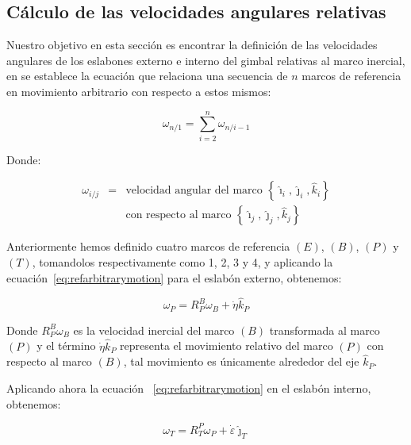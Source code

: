 \subsection{C\'{a}lculo de las velocidades angulares relativas}

Nuestro objetivo en esta secci\'{o}n es encontrar la definici\'{o}n de las
velocidades angulares de los eslabones externo e interno del gimbal
relativas al marco inercial, en \cite[82-84]{10} se establece la ecuaci\'{o}n que  relaciona una secuencia de $n$ marcos de referencia en movimiento arbitrario con respecto a estos mismos:

\begin{equation}
\omega _{n/1}=\overset{n}{\underset{i=2}{\sum }}\omega _{n/i-1}
\label{eq:refarbitrarymotion}
\end{equation}

Donde:

\begin{eqnarray*}
\omega _{i/j} &=&\text{velocidad angular del marco }\left\{ \hat{\imath}_{i},%
\hat{\jmath}_{i},\hat{k}_{i}\right\} \\
&&\text{con respecto al marco }\left\{ \hat{\imath}_{j},\hat{\jmath}_{j},%
\hat{k}_{j}\right\}
\end{eqnarray*}

Anteriormente hemos definido cuatro marcos de referencia $\left( E\right) $, 
$\left( B\right) $, $\left( P\right) $ y $\left( T\right) $, tomandolos
respectivamente como 1, 2, 3 y 4, y aplicando la ecuaci\'{o}n~\ref{eq:refarbitrarymotion} para el
eslab\'{o}n externo, obtenemos:

\begin{equation}
\omega _{P}=R_{P}^{B}\omega _{B}+\dot{\eta }\hat{k}_{P}
\label{eq:w_P}
\end{equation}

Donde $R_{P}^{B}\omega _{B}$ es la velocidad inercial del marco $\left( B\right) $ transformada al marco $\left( P\right) $ y el t\'{e}rmino $\dot{\eta }\hat{k}_{P}$ representa el movimiento relativo del marco $\left( P\right) $ con respecto al marco $\left( B\right) $, tal movimiento es \'{u}nicamente alrededor del eje $\hat{k}_{P}$.

Aplicando ahora la ecuaci\'{o}n ~\ref{eq:refarbitrarymotion} en el eslab\'{o}n interno, obtenemos:

\begin{equation}
\omega _{T}=R_{T}^{P}\omega _{P}+\dot{\varepsilon }\hat{\jmath}_{T}
\label{eq:w_T}
\end{equation}

